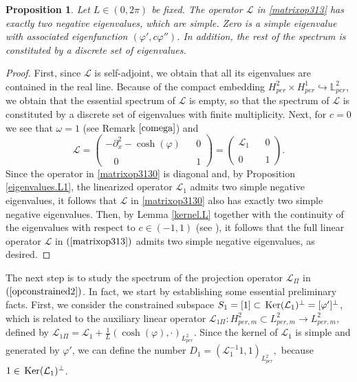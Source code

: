\documentclass[12pt,reqno,a4paper]{amsart} %
\newtheorem{prop}{Proposition}[section]
\newcommand{\Ker}{{\rm \,Ker}}
\numberwithin{equation}{section}
\numberwithin{figure}{section}
\begin{document}
 		\begin{prop}\label{2eigenvalues} Let $L\in (0,2\pi)$ be fixed.
 			The operator $\mathcal{L}$ in \eqref{matrixop313} has exactly two negative eigenvalues, which are simple. Zero is a simple eigenvalue with associated eigenfunction $(\varphi',c\varphi'')$. In addition, the rest of the
 			spectrum is constituted by a discrete set of eigenvalues.
 		\end{prop}  
 		\begin{proof} First, since $\mathcal{L}$  is self-adjoint, we obtain that all its eigenvalues are contained in the real line. Because of the compact embedding $H_{per}^2\times H_{per}^1\hookrightarrow \mathbb{L}_{per}^2$, we obtain that the essential spectrum of $\mathcal{L}$ is empty, so that the spectrum of $\mathcal{L}$ is constituted by a discrete set of eigenvalues with finite multiplicity. Next, for $c = 0$ we see that $\omega =  1$ (see Remark $\ref{comega}$) and
 			\begin{equation}\label{matrixop3130}
 				\displaystyle \mathcal{L}=\left(
 				\begin{array}{ccc}
 					-\partial_x^2-\cosh(\varphi) & &0\\\\
 					\ \ \ \ 0 & & 1
 				\end{array}\right)=\left(
 				\begin{array}{ccc}
 					\mathcal{L}_1 & &0 \\ \\ 
 					0 & & 1
 				\end{array}\right).
 			\end{equation}
 			Since the operator in \eqref{matrixop3130} is diagonal and, by Proposition \ref{eigenvalues.L1}, the linearized operator $\mathcal{L}_1$ admits two simple negative eigenvalues, it follows that $\mathcal{L}$ in \eqref{matrixop3130} also has exactly two simple negative eigenvalues. Then, by Lemma \ref{kernel.L} together with the continuity of the eigenvalues with respect to $c \in (-1,1)$ (see \cite[Chapter 4, Section 3.5]{kato}), it follows that the full linear operator $\mathcal{L}$ in $(\ref{matrixop313})$ admits two simple negative eigenvalues, as desired. 
 		\end{proof}
 		
 		The next step is to study the spectrum of the projection operator $\mathcal{L}_{\Pi}$ in $(\ref{opconstrained2})$. In fact, we start by establishing some essential preliminary facts. First, we consider the constrained subspace $S_1= [1] \subset \Ker(\mathcal{L}_1)^{\perp}=[\varphi']^{\bot}$, which is related to the auxiliary linear operator $\mathcal{L}_{1\Pi}: H^2_{per,m}\subset  L^2_{per,m}\rightarrow  L^2_{per,m}$, defined by $\displaystyle\mathcal{L}_{1\Pi}=\mathcal{L}_1+\frac{1}{L}(\cosh(\varphi),\cdot)_{L_{per}^2}$. Since the kernel of $\mathcal{L}_1$ is simple and generated by $\varphi'$, we can define the number $D_1=(\mathcal{L}_1^{-1} 1,1)_{L^2_{per}},$ because $1\in \Ker(\mathcal{L}_1)^{\bot}$.
 		
\end{document}
